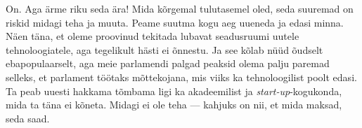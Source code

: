 
On. Aga ärme riku seda ära! Mida kõrgemal tulutasemel oled, seda suuremad on 
riskid midagi teha ja muuta. Peame suutma kogu aeg 
uueneda ja edasi minna. Näen täna, et oleme 
proovinud tekitada lubavat seadusruumi uutele tehnoloogiatele, aga tegelikult 
hästi ei õnnestu. Ja see kõlab nüüd õudselt ebapopulaarselt, aga meie parlamendi palgad 
peaksid olema palju paremad selleks, et parlament töötaks mõttekojana, 
mis viiks ka tehnoloogilist poolt edasi. Ta peab uuesti hakkama tõmbama ligi ka 
akadeemilist ja \emph{start-up}-kogukonda, mida ta täna ei 
kõneta. Midagi ei ole teha --- kahjuks on nii, et mida maksad, seda saad.